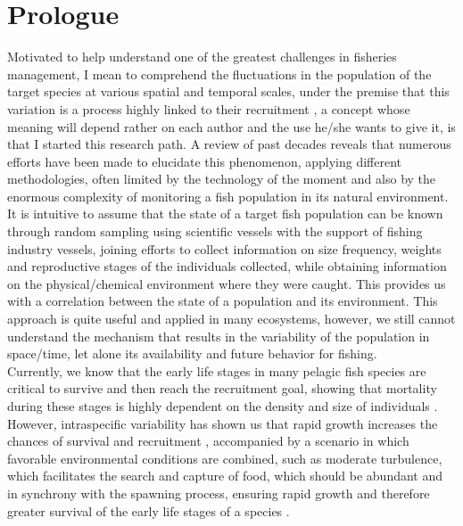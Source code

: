 \chapter{Prologue}

Motivated to help understand one of the greatest challenges in fisheries management, I mean to comprehend the fluctuations in the population of the target species at various spatial and temporal scales, under the premise that this variation is a process highly linked to their recruitment \citep{Cush1971,Lask1981,MaunThor2019}, a concept whose meaning will depend rather on each author and the use he/she wants to give it, is that I started this research path. A review of past decades reveals that numerous efforts have been made to elucidate this phenomenon, applying different methodologies, often limited by the technology of the moment and also by the enormous complexity of monitoring a fish population in its natural environment.\\

It is intuitive to assume that the state of a target fish population can be known through random sampling using scientific vessels with the support of fishing industry vessels, joining efforts to collect information on size frequency, weights and reproductive stages of the individuals collected, while obtaining information on the physical/chemical environment where they were caught. This provides us with a correlation between the state of a population and its environment. This approach is quite useful and applied in many ecosystems, however, we still cannot understand the mechanism that results in the variability of the population in space/time, let alone its availability and future behavior for fishing.\\

Currently, we know that the early life stages in many pelagic fish species are critical to survive and then reach the recruitment goal, showing that mortality during these stages is highly dependent on the density and size of individuals \citep{StigRoge2019}. However, intraspecific variability has shown us that rapid growth increases the chances of survival and recruitment \citep{OsseBoog1997,Soga1997,MeekVigl2006}, accompanied by a scenario in which favorable environmental conditions are combined, such as moderate turbulence, which facilitates the search and capture of food, which should be abundant and in synchrony with the spawning process, ensuring rapid growth and therefore greater survival of the early life stages of a species \citep{CuryRoy1989}.\\

